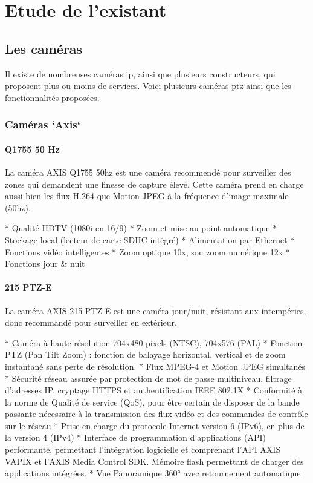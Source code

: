 \chapter[Etude de l'existant]{Etude de l'existant}
 \section{Les caméras}
 Il existe de nombreuses caméras ip, ainsi que plusieurs constructeurs, qui
 proposent plus ou moins de services. Voici plusieurs caméras ptz ainsi que les
 fonctionnalités proposées.
 \subsection{Caméras `Axis`}
 	\subsubsection{Q1755 50 Hz}
 La caméra AXIS Q1755 50hz est une caméra recommendé pour surveiller des zones
 qui demandent une finesse de capture élevé.
 Cette caméra prend en charge aussi bien les flux H.264 que Motion JPEG à la
 fréquence d'image maximale (50hz).
 
    * Qualité HDTV (1080i en 16/9)
    * Zoom et mise au point automatique
    * Stockage local (lecteur de carte SDHC intégré)
    * Alimentation par Ethernet
    * Fonctions vidéo intelligentes
 	* Zoom optique 10x, son zoom numérique 12x
 	* Fonctions jour & nuit
 	
 	\subsubsection{215 PTZ-E}
La caméra AXIS 215 PTZ-E est une caméra jour/nuit, résistant aux intempéries,
donc recommandé pour surveiller en extérieur.

    * Caméra à haute résolution 704x480 pixels (NTSC), 704x576 (PAL)
    * Fonction PTZ (Pan Tilt Zoom) : fonction de balayage horizontal, vertical
    et de zoom instantané sans perte de résolution. * Flux MPEG-4 et Motion JPEG simultanés
    * Sécurité réseau assurée par protection de mot de passe multiniveau,
    filtrage d’adresses IP, cryptage HTTPS et authentification IEEE 802.1X 
    * Conformité à la norme de Qualité de service (QoS), pour être certain de
    disposer de la bande passante nécessaire à la transmission des flux vidéo et
    des commandes de contrôle sur le réseau 
    * Prise en charge du protocole Internet version 6 (IPv6), en plus de la version 4 (IPv4) 
    * Interface de programmation d’applications (API) performante, permettant
    l’intégration logicielle et comprenant l’API AXIS VAPIX et l’AXIS Media
    Control SDK. Mémoire flash permettant de charger des applications intégrées.
 	* Vue Panoramique 360° avec retournement automatique
    
